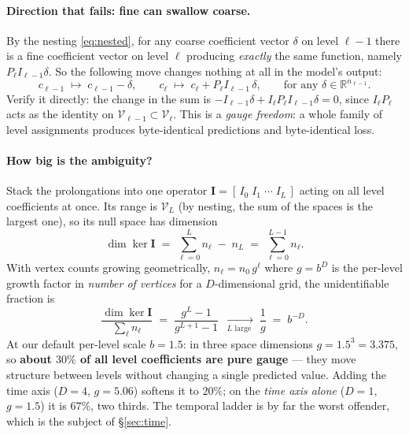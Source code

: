 \documentclass[11pt,a4paper]{article}
\newcommand{\Vs}{\mathcal{V}}
\begin{document}
\paragraph{Direction that fails: fine can swallow coarse.} By the nesting
\eqref{eq:nested}, for any coarse coefficient vector $\delta$ on level $\ell-1$ there is a
fine coefficient vector on level $\ell$ producing \emph{exactly} the same function, namely
$P_\ell I_{\ell-1}\delta$. So the following move changes nothing at all in the model's
output:
\begin{equation}
c_{\ell-1} \;\longmapsto\; c_{\ell-1} - \delta ,
\qquad
c_{\ell} \;\longmapsto\; c_{\ell} + P_\ell I_{\ell-1}\,\delta ,
\qquad\text{for any }\delta \in \mathbb{R}^{n_{\ell-1}} .
\label{eq:gauge}
\end{equation}
Verify it directly: the change in the sum is $-I_{\ell-1}\delta + I_\ell P_\ell
I_{\ell-1}\delta = 0$, since $I_\ell P_\ell$ acts as the identity on $\Vs_{\ell-1} \subset
\Vs_\ell$. This is a \emph{gauge freedom}: a whole family of level assignments produces
byte-identical predictions and byte-identical loss.

\paragraph{How big is the ambiguity?} Stack the prolongations into one operator
$\mathbf{I} = [\,I_0 \; I_1 \;\cdots\; I_L\,]$ acting on all level coefficients at once.
Its range is $\Vs_L$ (by nesting, the sum of the spaces is the largest one), so its null
space has dimension
\begin{equation}
\dim \ker \mathbf{I}
\;=\; \sum_{\ell=0}^{L} n_\ell \;-\; n_L
\;=\; \sum_{\ell=0}^{L-1} n_\ell .
\label{eq:nulldim}
\end{equation}
With vertex counts growing geometrically, $n_\ell = n_0\, g^{\ell}$ where $g = b^{D}$ is
the per-level growth factor in \emph{number of vertices} for a $D$-dimensional grid, the
unidentifiable fraction is
\begin{equation}
\frac{\dim \ker \mathbf{I}}{\sum_{\ell} n_\ell}
\;=\; \frac{g^{L}-1}{g^{L+1}-1}
\;\xrightarrow[\;L \text{ large}\;]{}\; \frac{1}{g}
\;=\; b^{-D} .
\label{eq:nullfrac}
\end{equation}
At our default per-level scale $b=1.5$: in three space dimensions $g = 1.5^3 = 3.375$, so
\textbf{about $30\%$ of all level coefficients are pure gauge} --- they move structure
between levels without changing a single predicted value. Adding the time axis ($D=4$,
$g=5.06$) softens it to $20\%$; on the \emph{time axis alone} ($D=1$, $g=1.5$) it is
$67\%$, two thirds. The temporal ladder is by far the worst offender, which is the subject
of \S\ref{sec:time}.
\end{document}
